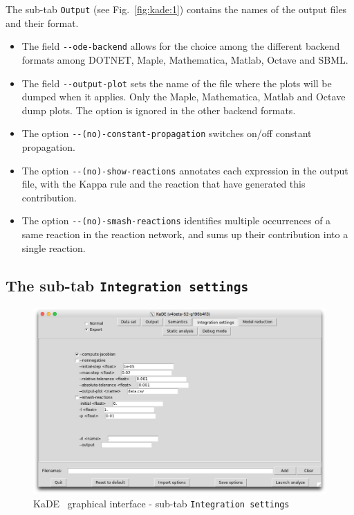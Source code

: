 \documentclass[11pt]{book}
\def\KaDE{\textsf{KaDE}}
\begin{document}
The sub-tab \texttt{Output} (see Fig.~\ref{fig:kade:1}) contains the names of the output files and their format.

\begin{itemize}
\item The field \texttt{-{}-ode-backend} allows for the choice among the different backend formats among DOTNET, Maple, Mathematica, Matlab, Octave and SBML.
\item The field \texttt{-{}-output-plot} sets the name of the file where the plots will be dumped when it applies. Only the Maple, Mathematica, Matlab and Octave dump plots. The option is ignored in the other backend formats.
\item The option \texttt{-{}-(no)-constant-propagation} switches on/off constant propagation.
\item The option \texttt{-{}-(no)-show-reactions} annotates each expression in the output file, with the Kappa rule and the reaction that have generated this contribution.
\item The option \texttt{-{}-(no)-smash-reactions} identifies multiple occurrences of a same reaction in the reaction network, and sums up  their contribution into a single reaction.
\end{itemize}


\subsection{The sub-tab \texttt{Integration settings}}

\begin{figure}[htbp]
\centering
\includegraphics[width=12cm,bb=0 0 1904 1208]{img/kade_3.png}
\caption{\KaDE~ graphical interface - sub-tab \texttt{Integration settings}}
\label{fig:kade:3}
\end{figure}
\end{document}
